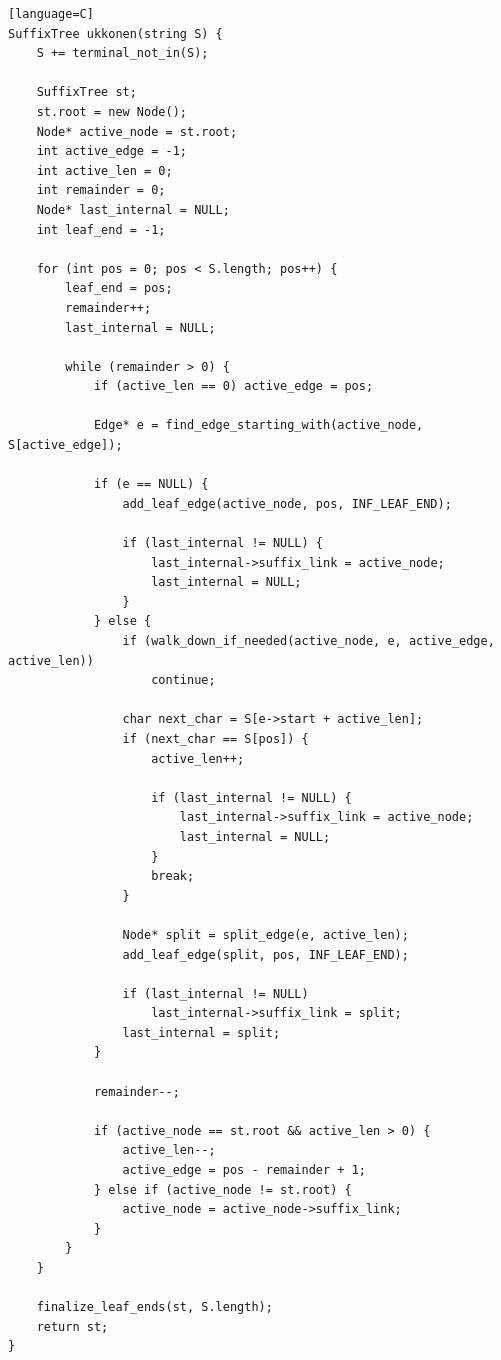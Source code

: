 \documentclass[11pt]{article}
\begin{document}
\begin{verbatim}[language=C]
SuffixTree ukkonen(string S) {
    S += terminal_not_in(S);

    SuffixTree st;
    st.root = new Node();
    Node* active_node = st.root;
    int active_edge = -1;
    int active_len = 0;
    int remainder = 0;
    Node* last_internal = NULL;
    int leaf_end = -1;

    for (int pos = 0; pos < S.length; pos++) {
        leaf_end = pos;
        remainder++;
        last_internal = NULL;

        while (remainder > 0) {
            if (active_len == 0) active_edge = pos;

            Edge* e = find_edge_starting_with(active_node, S[active_edge]);

            if (e == NULL) {
                add_leaf_edge(active_node, pos, INF_LEAF_END);

                if (last_internal != NULL) {
                    last_internal->suffix_link = active_node;
                    last_internal = NULL;
                }
            } else {
                if (walk_down_if_needed(active_node, e, active_edge, active_len))
                    continue;

                char next_char = S[e->start + active_len];
                if (next_char == S[pos]) {
                    active_len++;

                    if (last_internal != NULL) {
                        last_internal->suffix_link = active_node;
                        last_internal = NULL;
                    }
                    break;
                }

                Node* split = split_edge(e, active_len);
                add_leaf_edge(split, pos, INF_LEAF_END);

                if (last_internal != NULL)
                    last_internal->suffix_link = split;
                last_internal = split;
            }

            remainder--;

            if (active_node == st.root && active_len > 0) {
                active_len--;
                active_edge = pos - remainder + 1;
            } else if (active_node != st.root) {
                active_node = active_node->suffix_link;
            }
        }
    }

    finalize_leaf_ends(st, S.length);
    return st;
}
\end{verbatim}
\end{document}
